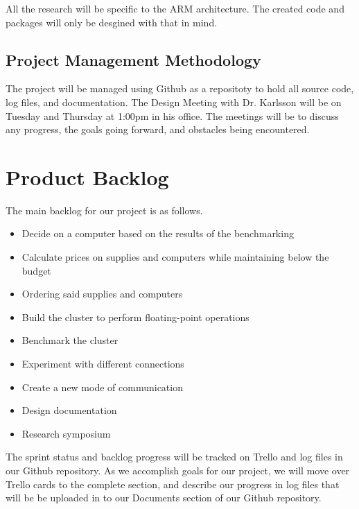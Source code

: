 All the research will be specific to the ARM architecture. The created code and packages will only be desgined with that in mind.

\subsection{Project  Management Methodology}

The project will be managed using Github as a repositoty to hold all source code, log files, and documentation. The Design Meeting with Dr. Karlsson will be on Tuesday and Thursday at 1:00pm in his office. The meetings will be to discuss any progress, the goals going forward, and obstacles being encountered. 

\section{Product Backlog}

The main backlog for our project is as follows.

\begin{itemize}
	\item Decide on a computer based on the results of the benchmarking
	\item Calculate prices on supplies and computers while maintaining below the budget
	\item Ordering said supplies and computers
	\item Build the cluster to perform floating-point operations
	\item Benchmark the cluster
	\item Experiment with different connections
	\item Create a new mode of communication
	\item Design documentation
	\item Research symposium
\end{itemize}

The sprint status and backlog progress will be tracked on Trello and log files in our Github repository. As we accomplish goals for our project, we will move over Trello cards to the complete section, and describe our progress in log files that will be be uploaded in to our Documents section of our Github repository.

